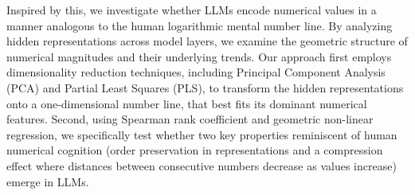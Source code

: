 


Inspired by this, we investigate whether LLMs encode numerical values in a manner analogous to the human logarithmic mental number line. By analyzing hidden representations across model layers, we examine the geometric structure of numerical magnitudes and their underlying trends. Our approach first employs dimensionality reduction techniques, including Principal Component Analysis (PCA) and Partial Least Squares (PLS), to transform the hidden representations onto a one-dimensional number line, that best fits its dominant numerical features. Second, using Spearman rank coefficient and geometric non-linear regression, we specifically test whether two key properties reminiscent of human numerical cognition (order preservation in representations and a compression effect where distances between consecutive numbers decrease as values increase) emerge in LLMs.

